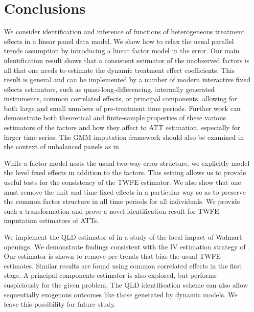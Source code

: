 \documentclass[12pt]{article}
\begin{document}
\section{Conclusions}\label{sec:conclusion}

We consider identification and inference of functions of heterogeneous treatment effects in a linear panel data model. We show how to relax the usual parallel trends assumption by introducing a linear factor model in the error. Our main identification result shows that a consistent estimator of the unobserved factors is all that one needs to estimate the dynamic treatment effect coefficients. This result is general and can be implemented by a number of modern interactive fixed effects estimators, such as quasi-long-differencing, internally generated instruments, common correlated effects, or principal components, allowing for both large and small numbers of pre-treatment time periods. Further work can demonstrate both theoretical and finite-sample properties of these various estimators of the factors and how they affect to ATT estimation, especially for larger time series. The GMM imputation framework should also be examined in the context of unbalanced panels as in \citet{Rai_2022}. 

While a factor model nests the usual two-way error structure, we explicitly model the level fixed effects in addition to the factors. This setting allows us to provide useful tests for the consistency of the TWFE estimator. We also show that one must remove the unit and time fixed effects in a particular way so as to preserve the common factor structure in all time periods for all individuals. We provide such a transformation and prove a novel identification result for TWFE imputation estimators of ATTs.

We implement the QLD estimator of \citet{Ahn_Lee_Schmidt_2013} in a study of the local impact of Walmart openings. We demonstrate findings consistent with the IV estimation strategy of \citet{basker2005job}.  Our estimator is shown to remove pre-trends that bias the usual TWFE estimates. Similar results are found using common correlated effects in the first stage. A principal components estimator is also explored, but performs suspiciously for the given problem. The QLD identification scheme can also allow sequentially exogenous outcomes like those generated by dynamic models. We leave this possibility for future study. 
\end{document}
